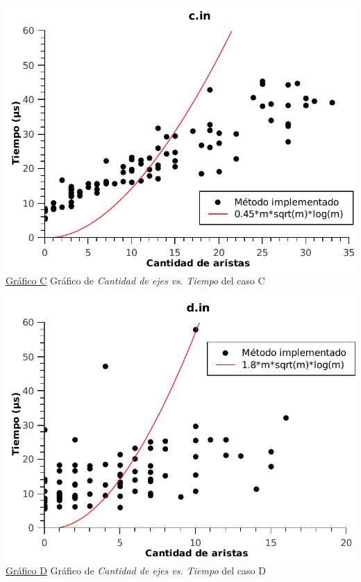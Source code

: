\begin{center}
\vspace*{1.5cm}
\label{graficoC}
\hspace*{-2.1cm}\includegraphics[scale = 0.9]{../ej2/pruebas_graficos/GraphC.pdf} \\
\underline{Gráfico C} Gráfico de \textit{Cantidad de ejes vs. Tiempo} del caso C

\vspace*{1.5cm}
\label{graficoD}
\hspace*{-2.1cm}\includegraphics[scale = 0.9]{../ej2/pruebas_graficos/GraphD.pdf} \\
\underline{Gráfico D} Gráfico de \textit{Cantidad de ejes vs. Tiempo} del caso D


\end{center}
